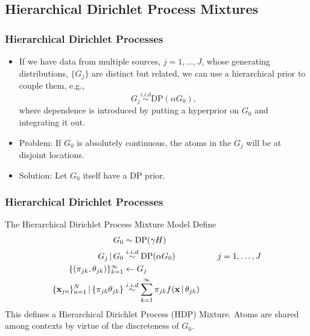\documentclass[11pt, serif, mathserif, table,trans]{beamer}
\begin{document}
\subsection{Hierarchical Dirichlet Process Mixtures}
\label{sec:dirichl-proc-mixt}
\begin{frame}
  \frametitle{Hierarchical Dirichlet Processes}
  \begin{itemize}[<+->]
  \item If we have data from multiple sources, $j = 1, \dots, J$,
    whose generating distributions, $\{G_j\}$ are distinct but related, we can
    use a hierarchical prior to couple them, e.g.,
    \begin{equation}
      \label{eq:11}
      G_j \stackrel{i.i.d}{\sim} \mathrm{DP}(\alpha G_0),
    \end{equation}
    where dependence is introduced by putting a hyperprior on $G_0$
    and integrating it out.
  \item Problem: If $G_0$ is absolutely continuous, the atoms in the
    $G_j$ will be at disjoint locations.
  \item Solution: Let $G_0$ itself have a DP prior.
  \end{itemize}
\end{frame}

\begin{frame}
  \frametitle{Hierarchical Dirichlet Processes}
    \begin{infoblock}{The Hierarchical Dirichlet Process Mixture Model
        \cite{teh2006hierarchical}}
      Define
      \begin{align}
        G_0 &\sim \mathrm{DP}(\gamma H) \\
        G_j \, \vert \, G_0 &\stackrel{i.i.d}{\sim} \mathrm{DP}(\alpha G_0) \qquad \qquad \quad j = 1, \dots, J\\
        \{(\pi_{jk}, \theta_{jk})\}_{k=1}^{\infty} &\leftarrow G_j \\
        \{\mathbf{x}_{jn}\}_{n=1}^N \, \vert \, \{\pi_{jk} \theta_{jk}\}
        &\stackrel{i.i.d}{\sim} \sum_{k=1}^{\infty} \pi_{jk}
        f(\mathbf{x} \, \vert \, \theta_{jk})
      \end{align}
      This defines a Hierarchical Dirichlet Process (HDP) Mixture.
      Atoms are shared among contexts by virtue of the discreteness of $G_0$.
    \end{infoblock}
\end{frame}
\end{document}
